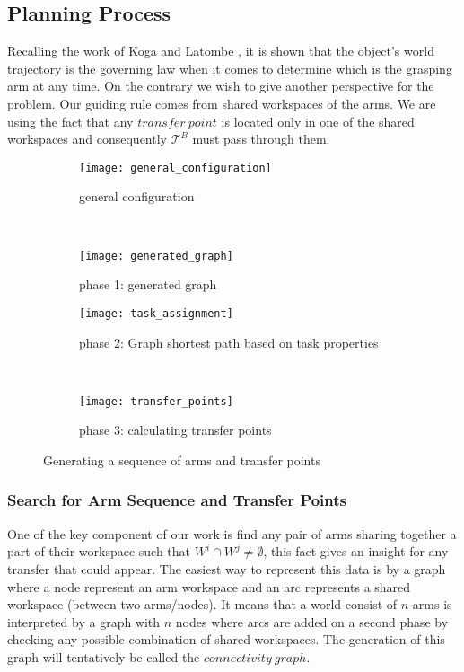 \subsection{Planning Process}
Recalling the work of Koga and Latombe \cite{koga1994multi}, it is shown that the object's world trajectory is the governing law when it comes to determine which is the grasping arm at any time. On the contrary we wish to give another perspective for the problem. Our guiding rule comes from shared workspaces of the arms. We are using the fact that any $transfer~point$ is located only in one of the shared workspaces and consequently $\mathcal{T}^B$ must pass through them. 

\begin{figure}[t]
    \centering
    \begin{subfigure}[b]{0.4\textwidth}
        \texttt{[image: general\_configuration]}
        \caption{general configuration}
        \label{fig:general_configuration}
    \end{subfigure}
    ~~~~
    \begin{subfigure}[b]{0.4\textwidth}
        \texttt{[image: generated\_graph]}
        \caption{phase 1: generated graph}
        \label{fig:generated_graph}
    \end{subfigure}  
    
    \begin{subfigure}[b]{0.4\textwidth}
        \texttt{[image: task\_assignment]}
        \caption{phase 2: Graph shortest path based on task properties }
        \label{fig:task_assignment}
    \end{subfigure}
    ~~~~
    \begin{subfigure}[b]{0.4\textwidth}
        \texttt{[image: transfer\_points]}
        \caption{phase 3: calculating transfer points}
        \label{fig:transfer_points}
    \end{subfigure}
    \caption{Generating a sequence of arms and transfer points}\label{fig:animals}
\end{figure}

\subsubsection*{Search for Arm Sequence and Transfer Points}

One of the key component of our work is find any pair of arms sharing together a part of their workspace such that $W^i \cap W^j \neq \emptyset$, this fact gives an insight for any transfer that could appear. The easiest way to represent this data is by a graph where a node represent an arm workspace and an arc represents a shared workspace (between two arms/nodes). It means that a world consist of $n$ arms is interpreted by a graph with $n$ nodes where arcs are added on a second phase by checking any possible combination of shared workspaces. The generation of this graph will tentatively be called the $connectivity~graph$.

